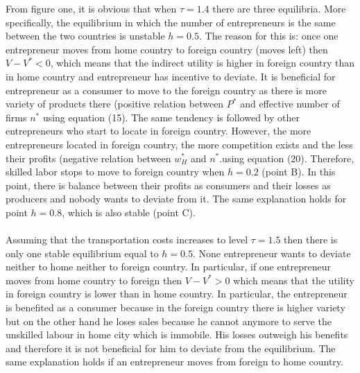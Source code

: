 \documentclass[11pt]{article}
\begin{document}
From figure one, it is obvious that when $\tau=1.4$ there are three equilibria. More specifically, the equilibrium in which the number of entrepreneurs is the same between the two countries is unstable $h=0.5$. The reason for this is: once one entrepreneur moves from home country to foreign country (moves left) then $V-V^{\ast}<0$, which means that the indirect utility is higher in foreign country than in home country and entrepreneur has incentive to deviate. It is beneficial for entrepreneur as a consumer to move to the foreign country as there is more variety of products there (positive relation between $P^{\ast}$ and effective number of firms $n^{\ast}$ using equation (15). The same tendency is followed by other entrepreneurs who start to locate in foreign country. However, the more entrepreneurs located in foreign country, the more competition exists and the less their profits (negative relation between $w^{\ast}_{H}$ and $n^{\ast}$.using equation (20). Therefore, skilled labor stops to move to foreign country when $h=0.2$ (point B). In this point, there is balance between their profits as consumers and their losses as producers and nobody wants to deviate from it. The same explanation holds for point $h=0.8$, which is also stable (point C). 
\\
\\
Assuming that the transportation costs increases to level  $\tau=1.5$ then there is only one stable equilibrium equal to $h=0.5$. None entrepreneur wants to deviate neither to home neither to foreign country. In particular, if one entrepreneur moves from home country to foreign then $V-V^{\ast}>0$ which means that the utility in foreign country is lower than in home country. In particular, the entrepreneur is benefited as a consumer because in the foreign country there is higher variety but on the other hand he loses sales because he cannot anymore to serve the unskilled labour in home city which is immobile. His losses outweigh his benefits and therefore it is not beneficial for him to deviate from the equilibrium. The same explanation holds if an entrepreneur moves from foreign to home country. 
\\
\\
\end{document}
